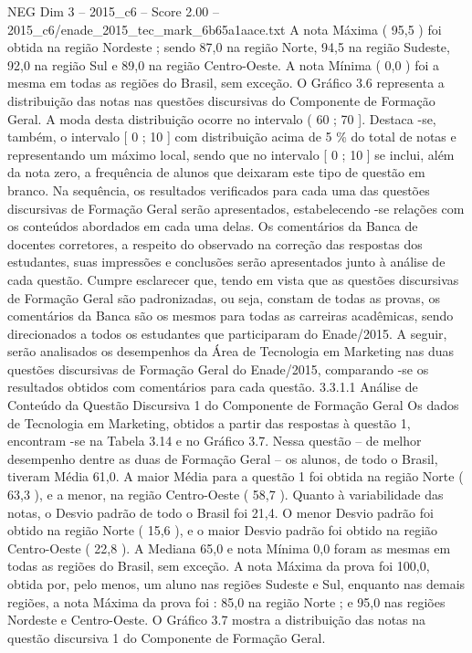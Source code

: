 \begin{textsample}{NEG Dim 3 – 2015\_c6 – Score 2.00 – 2015\_c6/enade\_2015\_tec\_mark\_6b65a1aace.txt}
A nota Máxima ( 95,5 ) foi obtida na região Nordeste ; sendo 87,0 na região Norte, 94,5 na região Sudeste, 92,0 na região Sul e 89,0 na região Centro-Oeste.
A nota Mínima ( 0,0 ) foi a mesma em todas as regiões do Brasil, sem exceção.
O Gráfico 3.6 representa a distribuição das notas nas questões discursivas do Componente de Formação Geral.
A moda desta distribuição ocorre no intervalo ( 60 ; 70 ].
Destaca -se, também, o intervalo [ 0 ; 10 ] com distribuição acima de 5 \% do total de notas e representando um máximo local, sendo que no intervalo [ 0 ; 10 ] se inclui, além da nota zero, a frequência de alunos que deixaram este tipo de questão em branco.
Na sequência, os resultados verificados para cada uma das questões discursivas de Formação Geral serão apresentados, estabelecendo -se relações com os conteúdos abordados em cada uma delas.
Os comentários da Banca de docentes corretores, a respeito do observado na correção das respostas dos estudantes, suas impressões e conclusões serão apresentados junto à análise de cada questão.
Cumpre esclarecer que, tendo em vista que as questões discursivas de Formação Geral são padronizadas, ou seja, constam de todas as provas, os comentários da Banca são os mesmos para todas as carreiras acadêmicas, sendo direcionados a todos os estudantes que participaram do Enade/2015.
A seguir, serão analisados os desempenhos da Área de Tecnologia em Marketing nas duas questões discursivas de Formação Geral do Enade/2015, comparando -se os resultados obtidos com comentários para cada questão. 3.3.1.1 Análise de Conteúdo da Questão Discursiva 1 do Componente de Formação Geral Os dados de Tecnologia em Marketing, obtidos a partir das respostas à questão 1, encontram -se na Tabela 3.14 e no Gráfico 3.7.
Nessa questão – de melhor desempenho dentre as duas de Formação Geral – os alunos, de todo o Brasil, tiveram Média 61,0.
A maior Média para a questão 1 foi obtida na região Norte ( 63,3 ), e a menor, na região Centro-Oeste ( 58,7 ).
Quanto à variabilidade das notas, o Desvio padrão de todo o Brasil foi 21,4.
O menor Desvio padrão foi obtido na região Norte ( 15,6 ), e o maior Desvio padrão foi obtido na região Centro-Oeste ( 22,8 ).
A Mediana 65,0 e nota Mínima 0,0 foram as mesmas em todas as regiões do Brasil, sem exceção.
A nota Máxima da prova foi 100,0, obtida por, pelo menos, um aluno nas regiões Sudeste e Sul, enquanto nas demais regiões, a nota Máxima da prova foi : 85,0 na região Norte ; e 95,0 nas regiões Nordeste e Centro-Oeste.
O Gráfico 3.7 mostra a distribuição das notas na questão discursiva 1 do Componente de Formação Geral.

\end{textsample}
